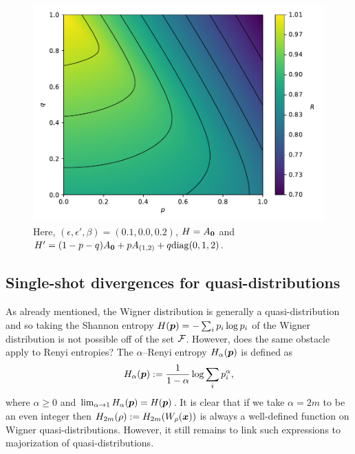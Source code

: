 \documentclass[pra,
aps,
twocolumn,
superscriptaddress,
groupedaddress,
nofootinbib,
reprint
]{revtex4-1}
\begin{document}
\begin{figure}
    \centering
    \includegraphics[scale=0.4]{figs/test/R_vs_A.pdf}
    \caption{Here, $(\epsilon, \epsilon', \beta) = (0.1, 0.0, 0.2)$, $H = A_{\bm{0}}$ and $H' = (1-p-q)A_{\bm{0}}+pA_{(1,2)}+q{\rm{diag}}(0,1,2)$.
    }
    \label{fig:rvsa}
\end{figure}

\newpage
\subsection{Single-shot divergences for quasi-distributions}
As already mentioned, the Wigner distribution is generally a quasi-distribution and so taking the Shannon entropy $H(\boldsymbol{p}) = -\sum_i p_i \log p_i$ of the Wigner distribution is not possible off of the set ${\mathcal F}$. However, does the same obstacle apply to Renyi entropies? The $\alpha$--Renyi entropy $H_\alpha(\boldsymbol{p})$ is defined as
\begin{equation}
	H_\alpha(\boldsymbol{p}) := \frac{1}{1-\alpha} \log \sum_i p_i^\alpha,
\end{equation}
where $\alpha \ge 0$ and $\lim_{\alpha \rightarrow 1} H_\alpha(\boldsymbol{p}) = H(\boldsymbol{p})$. It is clear that if we take $\alpha = 2m$ to be an even integer then $H_{2m}(\rho) := H_{2m}(W_\rho(\boldsymbol{x}))$ is always a well-defined function on Wigner quasi-distributions. However, it still remains to link such expressions to majorization of quasi-distributions.
 
\end{document}
